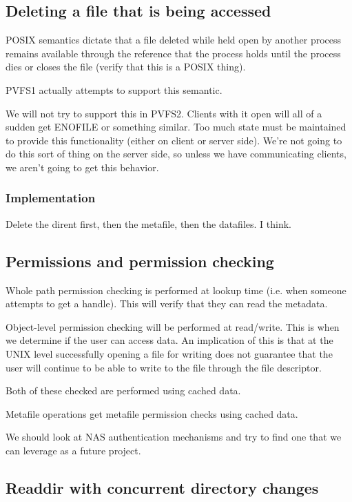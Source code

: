 \documentclass[10pt]{article} %
\begin{document}
%
%
\subsection{Deleting a file that is being accessed}

POSIX semantics dictate that a file deleted while held open by another process
remains available through the reference that the process holds until the
process dies or closes the file (verify that this is a POSIX thing).

PVFS1 actually attempts to support this semantic.

We will not try to support this in PVFS2.  Clients with it open will all of a
sudden get ENOFILE or something similar.  Too much state must be maintained to
provide this functionality (either on client or server side).  We're not going
to do this sort of thing on the server side, so unless we have communicating
clients, we aren't going to get this behavior.

\subsubsection{Implementation}

Delete the dirent first, then the metafile, then the datafiles.  I think.

%
%
\subsection{Permissions and permission checking}

Whole path permission checking is performed at lookup time (i.e. when someone
attempts to get a handle).  This will verify that they can read the metadata.

Object-level permission checking will be performed at read/write.  This is
when we determine if the user can access data.  An implication of this is that
at the UNIX level successfully opening a file for writing does not guarantee
that the user will continue to be able to write to the file through the file descriptor.

Both of these checked are performed using cached data.

Metafile operations get metafile permission checks using cached data.

We should look at NAS authentication mechanisms and try to find one that we
can leverage as a future project.

\subsection{Readdir with concurrent directory changes}
\end{document}
